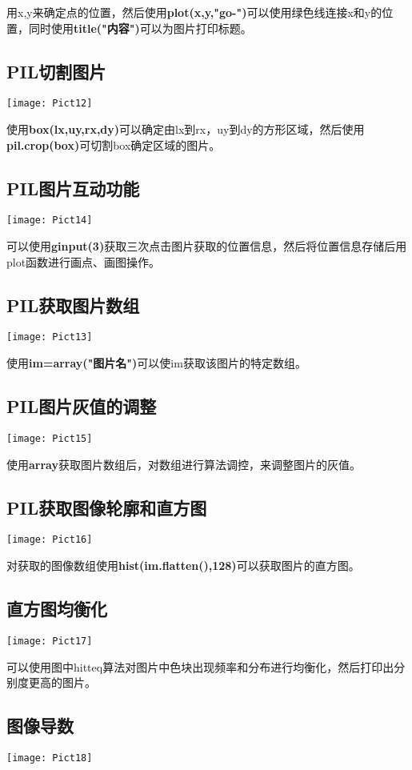 \documentclass[a4paper, 12pt]{article}
\begin{document}
用x,y来确定点的位置，然后使用\textbf{plot(x,y,"go-")}可以使用绿色线连接x和y的位置，同时使用\textbf{title("内容")}可以为图片打印标题。
\subsection{\small PIL切割图片}
\texttt{[image: Pict12]}

使用\textbf{box(lx,uy,rx,dy)}可以确定由lx到rx，uy到dy的方形区域，然后使用\textbf{pil.crop(box)}可切割box确定区域的图片。
\subsection{\small PIL图片互动功能}
\texttt{[image: Pict14]}

可以使用\textbf{ginput(3)}获取三次点击图片获取的位置信息，然后将位置信息存储后用plot函数进行画点、画图操作。
\subsection{\small PIL获取图片数组}
\texttt{[image: Pict13]}

使用\textbf{im=array("图片名")}可以使im获取该图片的特定数组。
\subsection{\small PIL图片灰值的调整}
\texttt{[image: Pict15]}

使用\textbf{array}获取图片数组后，对数组进行算法调控，来调整图片的灰值。
\subsection{\small PIL获取图像轮廓和直方图}
\texttt{[image: Pict16]}

对获取的图像数组使用\textbf{hist(im.flatten(),128)}可以获取图片的直方图。
\subsection{\small 直方图均衡化}
\texttt{[image: Pict17]}

可以使用图中hitteq算法对图片中色块出现频率和分布进行均衡化，然后打印出分别度更高的图片。
\subsection{\small 图像导数}
\texttt{[image: Pict18]}
\end{document}
